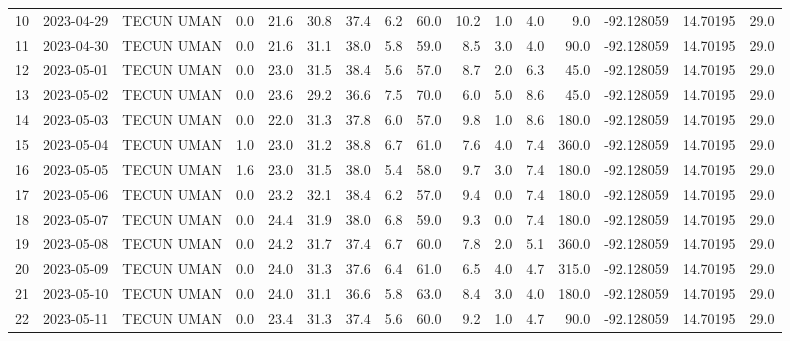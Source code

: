 \documentclass[12pt]{article}
\begin{document}
\begin{center}
\begin{tabular}{lllrrrrrrrrrrrrr}
10  & 2023-04-29 &  TECUN UMAN &     0.0 &  21.6 &   30.8 &  37.4 &      6.2 &     60.0 &       10.2 &  1.0 &         4.0 &         9.0 & -92.128059 &  14.70195 &     29.0 \\
11  & 2023-04-30 &  TECUN UMAN &     0.0 &  21.6 &   31.1 &  38.0 &      5.8 &     59.0 &        8.5 &  3.0 &         4.0 &        90.0 & -92.128059 &  14.70195 &     29.0 \\
12  & 2023-05-01 &  TECUN UMAN &     0.0 &  23.0 &   31.5 &  38.4 &      5.6 &     57.0 &        8.7 &  2.0 &         6.3 &        45.0 & -92.128059 &  14.70195 &     29.0 \\
13  & 2023-05-02 &  TECUN UMAN &     0.0 &  23.6 &   29.2 &  36.6 &      7.5 &     70.0 &        6.0 &  5.0 &         8.6 &        45.0 & -92.128059 &  14.70195 &     29.0 \\
14  & 2023-05-03 &  TECUN UMAN &     0.0 &  22.0 &   31.3 &  37.8 &      6.0 &     57.0 &        9.8 &  1.0 &         8.6 &       180.0 & -92.128059 &  14.70195 &     29.0 \\
15  & 2023-05-04 &  TECUN UMAN &     1.0 &  23.0 &   31.2 &  38.8 &      6.7 &     61.0 &        7.6 &  4.0 &         7.4 &       360.0 & -92.128059 &  14.70195 &     29.0 \\
16  & 2023-05-05 &  TECUN UMAN &     1.6 &  23.0 &   31.5 &  38.0 &      5.4 &     58.0 &        9.7 &  3.0 &         7.4 &       180.0 & -92.128059 &  14.70195 &     29.0 \\
17  & 2023-05-06 &  TECUN UMAN &     0.0 &  23.2 &   32.1 &  38.4 &      6.2 &     57.0 &        9.4 &  0.0 &         7.4 &       180.0 & -92.128059 &  14.70195 &     29.0 \\
18  & 2023-05-07 &  TECUN UMAN &     0.0 &  24.4 &   31.9 &  38.0 &      6.8 &     59.0 &        9.3 &  0.0 &         7.4 &       180.0 & -92.128059 &  14.70195 &     29.0 \\
19  & 2023-05-08 &  TECUN UMAN &     0.0 &  24.2 &   31.7 &  37.4 &      6.7 &     60.0 &        7.8 &  2.0 &         5.1 &       360.0 & -92.128059 &  14.70195 &     29.0 \\
20  & 2023-05-09 &  TECUN UMAN &     0.0 &  24.0 &   31.3 &  37.6 &      6.4 &     61.0 &        6.5 &  4.0 &         4.7 &       315.0 & -92.128059 &  14.70195 &     29.0 \\
21  & 2023-05-10 &  TECUN UMAN &     0.0 &  24.0 &   31.1 &  36.6 &      5.8 &     63.0 &        8.4 &  3.0 &         4.0 &       180.0 & -92.128059 &  14.70195 &     29.0 \\
22  & 2023-05-11 &  TECUN UMAN &     0.0 &  23.4 &   31.3 &  37.4 &      5.6 &     60.0 &        9.2 &  1.0 &         4.7 &        90.0 & -92.128059 &  14.70195 &     29.0 \\

\end{tabular}
\end{center}
\end{document}
